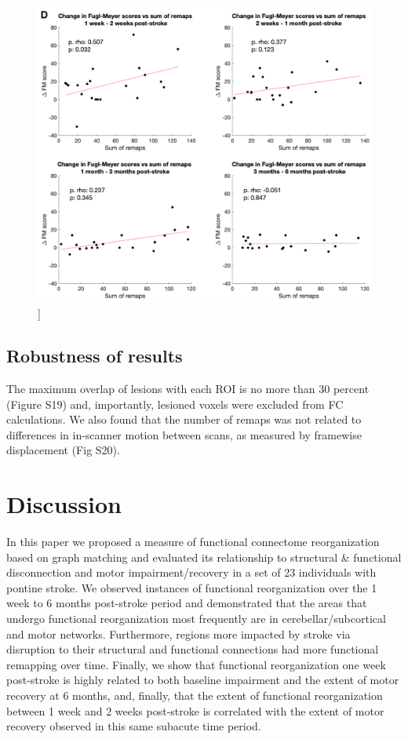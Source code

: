 \documentclass[phd,tocprelim]{cornell}
\renewcommand{\caption}[1]{\singlespacing\hangcaption{#1}\normalspacing}
\begin{document}
\null
\vfill
\clearpage
\null
\vfill
\begin{figure}[h!]
		\ContinuedFloat
		\captionsetup{labelformat=adja-page}
    \centering
    \includegraphics[width=\textwidth]{chapter1/Figure5D.png}
    \caption[]{}
\end{figure}
\null
\vfill
\clearpage
	\subsection{Robustness of results}
	The maximum overlap of lesions with each ROI is no more than 30 percent (Figure S19) and, importantly, lesioned voxels were excluded from FC calculations. We also found that the number of remaps was not related to differences in in-scanner motion between scans, as measured by framewise displacement (Fig S20).

\section{Discussion}
	In this paper we proposed a measure of functional connectome reorganization based on graph matching and evaluated its relationship to structural $\&$ functional disconnection and motor impairment/recovery in a set of 23 individuals with pontine stroke. We observed instances of functional reorganization over the 1 week to 6 months post-stroke period and demonstrated that the areas that undergo functional reorganization most frequently are in cerebellar/subcortical and motor networks. Furthermore, regions more impacted by stroke via disruption to their structural and functional connections had more functional remapping over time. Finally, we show that functional reorganization one week post-stroke is highly related to both baseline impairment and the extent of motor recovery at 6 months, and, finally, that the extent of functional reorganization between 1 week and 2 weeks post-stroke is correlated with the extent of motor recovery observed in this same subacute time period.
	
\end{document}
